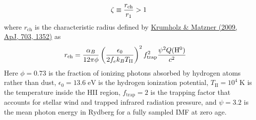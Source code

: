 \documentclass[letterpaper,10pt,english]{sphinxmanual}
\begin{document}
\begin{gather}
\begin{split}\zeta \equiv \frac{r_{\mathrm{ch}}}{r_1} > 1\end{split}\notag
\end{gather}
where \(r_{\mathrm{ch}}\) is the
characteristic radius defined by \href{http://adsabs.harvard.edu/abs/2009ApJ...703.1352K}{Krumholz \& Matzner (2009, ApJ,
703, 1352)} as
\begin{gather}
\begin{split}r_{\mathrm{ch}} & = \frac{\alpha_B}{12\pi\phi}
\left(\frac{\epsilon_0}{2 f_e k_B T_{\mathrm{II}}}\right)^2
f_{\mathrm{trap}}^2 \frac{\psi^2 Q(\mathrm{H}^0)}{c^2}\end{split}\notag
\end{gather}
Here  \(\phi = 0.73\) is the fraction of ionizing photons absorbed
by hydrogen atoms rather than dust, \(\epsilon_0 =
13.6\;\mathrm{eV}\) is the hydrogen ionization potential,
\(T_{\mathrm{II}} = 10^4\;\mathrm{K}\) is the temperature inside
the HII region, \(f_{\mathrm{trap}} = 2\) is the trapping factor
that accounts for stellar wind and trapped infrared radiation
pressure, and \(\psi = 3.2\) is the mean photon energy in Rydberg for
a fully sampled IMF at zero age.
\end{document}
